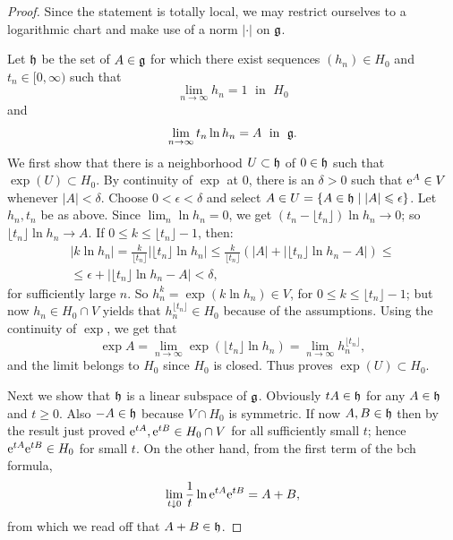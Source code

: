 \begin{proof}
    Since the statement is totally local, we may restrict ourselves to a logarithmic chart and make use of a norm $|\cdot |$ on $\mathfrak{g}$.

    Let $\mathfrak{h}$ be the set of $A\in\mathfrak{g}$ for which there exist sequences $(h_n)\in H_0$ and $t_n\in[0,\infty)$ such that 
    \[\lim_{n\to\infty} h_n=1\;\text{ in }\;H_0\] and 
    \[\lim_{n\to\infty} t_n \ln h_n=A\;\text{ in }\;\mathfrak{g}.\]
    We first show that there is a neighborhood $U\subset \mathfrak{h}$ of $0\in\mathfrak{h}$ such that $\exp(U)\subset H_0$. By continuity of $\exp$ at $0$, there is an $\delta>0$ such that $\mathrm{e}^A\in V$ whenever $|A|<\delta$. Choose $0<\epsilon<\delta$ and select $A\in U=\{A\in\mathfrak{h}\mid |A|\leqslant \epsilon\}$. Let $h_n,t_n$ be as above. Since $\lim_n \ln h_n=0$, we get $(t_n-\lfloor t_n\rfloor)\ln h_n\to 0$; so $\lfloor t_n\rfloor \ln h_n\to A$. If $0\leq k\leq \lfloor t_n\rfloor -1$, then:
    \begin{multline}
        |k\ln h_n|=\frac{k}{\lfloor t_n\rfloor}|\lfloor t_n\rfloor \ln h_n|\leq 
    \frac{k}{\lfloor t_n\rfloor}(|A|+|\lfloor t_n\rfloor \ln h_n-A|)\leq \\
    \leq \epsilon+|\lfloor t_n\rfloor \ln h_n-A|<\delta,
    \end{multline}
    for sufficiently large $n$. So $h_n^k=\exp(k\ln h_n)\in V$, for $0\leq k\leq \lfloor t_n\rfloor -1$; but now $h_n\in H_0\cap V$ yields that $h_n^{\lfloor t_n\rfloor}\in H_0$ because of the assumptions. Using the continuity of $\exp$, we get that
    \[\exp A=\lim_{n\to \infty}\exp\left(\lfloor t_n\rfloor \ln h_n\right)=\lim_{n\to\infty} h_n^{\lfloor t_n\rfloor},\]
    and the limit belongs to $H_0$ since $H_0$ is closed. Thus proves $\exp(U)\subset H_0$.

    Next we show that $\mathfrak{h}$ is a linear subspace of $\mathfrak{g}$. Obviously $tA\in\mathfrak{h}$ for any $A\in\mathfrak{h}$ and $t\geq 0$. Also $-A\in\mathfrak{h}$ because $V\cap H_0$ is symmetric. If now $A,B\in\mathfrak{h}$ then by the result just proved $\mathrm{e}^{tA},\mathrm{e}^{tB}\in H_0\cap V$ for all sufficiently small $t$; hence $\mathrm{e}^{tA}\mathrm{e}^{tB}\in H_0$ for small $t$. On the other hand, from the first term of the \gls{bch} formula,
    \[\lim_{t\downarrow 0}\frac{1}{t} \ln \mathrm{e}^{tA}\mathrm{e}^{tB}=A+B,\]
    from which we read off that $A+B\in\mathfrak{h}$.


\end{proof}

